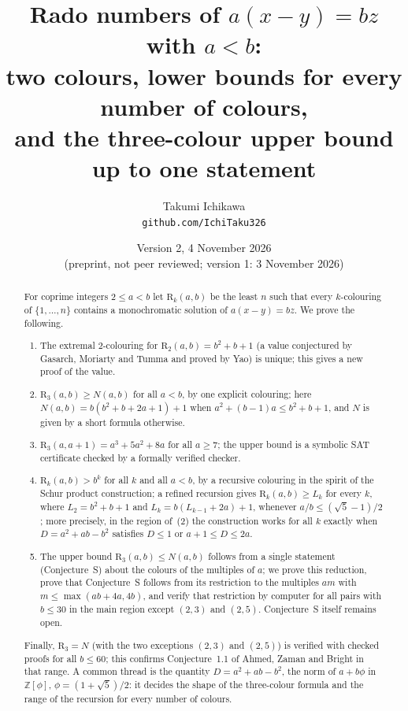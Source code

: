 \documentclass[11pt,a4paper]{article}
\title{Rado numbers of $a(x-y)=bz$ with $a<b$:\\[4pt]
\large two colours, lower bounds for every number of colours,\\
and the three-colour upper bound up to one statement}
\author{Takumi Ichikawa\\ \small\texttt{github.com/IchiTaku326}}
\date{Version 2, 4 November 2026\\ \small (preprint, not peer reviewed; version 1: 3 November 2026)}
\theoremstyle{definition}
\theoremstyle{remark}
\newcommand{\R}{\mathrm{R}}
\begin{document}
\maketitle

\begin{abstract}
For coprime integers $2\le a<b$ let $\R_k(a,b)$ be the least $n$ such that every $k$-colouring of $\{1,\dots,n\}$ contains a monochromatic solution of $a(x-y)=bz$.
We prove the following.
\begin{enumerate}[label=(\arabic*),leftmargin=2em,itemsep=1pt,topsep=2pt]
\item The extremal $2$-colouring for $\R_2(a,b)=b^2+b+1$ (a value conjectured by Gasarch, Moriarty and Tumma and proved by Yao) is unique; this gives a new proof of the value.
\item $\R_3(a,b)\ge N(a,b)$ for all $a<b$, by one explicit colouring; here $N(a,b)=b(b^2+b+2a+1)+1$ when $a^2+(b-1)a\le b^2+b+1$, and $N$ is given by a short formula otherwise.
\item $\R_3(a,a+1)=a^3+5a^2+8a$ for all $a\ge7$; the upper bound is a symbolic SAT certificate checked by a formally verified checker.
\item $\R_k(a,b)>b^k$ for all $k$ and all $a<b$, by a recursive colouring in the spirit of the Schur product construction; a refined recursion gives $\R_k(a,b)\ge L_k$ for every $k$, where $L_2=b^2+b+1$ and $L_k=b(L_{k-1}+2a)+1$, whenever $a/b\le(\sqrt5-1)/2$; more precisely, in the region of~(2) the construction works for all $k$ exactly when $D=a^2+ab-b^2$ satisfies $D\le1$ or $a+1\le D\le2a$.
\item The upper bound $\R_3(a,b)\le N(a,b)$ follows from a single statement (Conjecture~S) about the colours of the multiples of $a$; we prove this reduction, prove that Conjecture~S follows from its restriction to the multiples $am$ with $m\le\max(ab+4a,4b)$, and verify that restriction by computer for all pairs with $b\le30$ in the main region except $(2,3)$ and $(2,5)$. Conjecture~S itself remains open.
\end{enumerate}
Finally, $\R_3=N$ (with the two exceptions $(2,3)$ and $(2,5)$) is verified with checked proofs for all $b\le60$; this confirms Conjecture~1.1 of Ahmed, Zaman and Bright in that range. A common thread is the quantity $D=a^2+ab-b^2$, the norm of $a+b\phi$ in $\mathbb Z[\phi]$, $\phi=(1+\sqrt5)/2$: it decides the shape of the three-colour formula and the range of the recursion for every number of colours.
\end{abstract}
\end{document}
